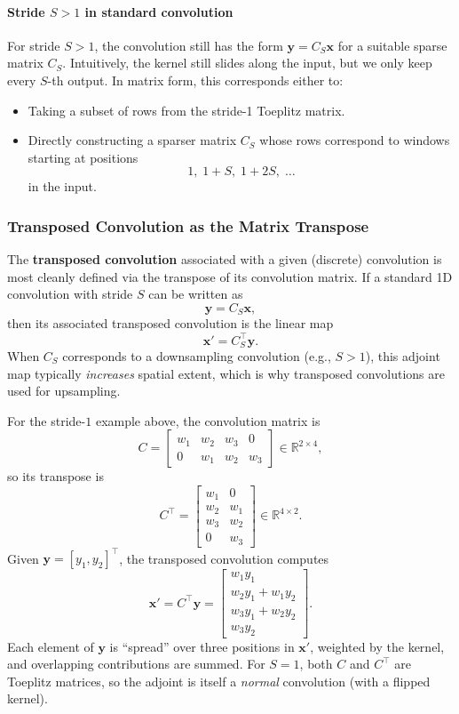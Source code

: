 \paragraph{Stride \(S>1\) in standard convolution}

\noindent
For stride \(S>1\), the convolution still has the form \(\mathbf{y} = C_S \mathbf{x}\) for a suitable sparse matrix \(C_S\). Intuitively, the kernel still slides along the input, but we only keep every \(S\)-th output. In matrix form, this corresponds either to:

\begin{itemize}
	\item Taking a subset of rows from the stride-1 Toeplitz matrix.
	\item Directly constructing a sparser matrix \(C_S\) whose rows correspond to windows starting at positions
	\[
	1,\; 1 + S,\; 1 + 2S,\; \dots
	\]
	in the input.
\end{itemize}

\subsubsection{Transposed Convolution as the Matrix Transpose}

\noindent
The \textbf{transposed convolution} associated with a given (discrete) convolution is most cleanly defined via the transpose of its convolution matrix. If a standard 1D convolution with stride \(S\) can be written as
\[
\mathbf{y} = C_S \mathbf{x},
\]
then its associated transposed convolution is the linear map
\[
\mathbf{x}' = C_S^\top \mathbf{y}.
\]
When \(C_S\) corresponds to a downsampling convolution (e.g., \(S > 1\)), this adjoint map typically \emph{increases} spatial extent, which is why transposed convolutions are used for upsampling.

\medskip

\noindent
For the stride-\(1\) example above, the convolution matrix is
\[
C =
\begin{bmatrix}
	w_1 & w_2 & w_3 & 0 \\
	0   & w_1 & w_2 & w_3
\end{bmatrix}
\in \mathbb{R}^{2 \times 4},
\]
so its transpose is
\[
C^\top =
\begin{bmatrix}
	w_1 & 0   \\
	w_2 & w_1 \\
	w_3 & w_2 \\
	0   & w_3
\end{bmatrix}
\in \mathbb{R}^{4 \times 2}.
\]
Given \(\mathbf{y} = [y_1, y_2]^\top\), the transposed convolution computes
\[
\mathbf{x}' = C^\top \mathbf{y}
=
\begin{bmatrix}
	w_1 y_1 \\
	w_2 y_1 + w_1 y_2 \\
	w_3 y_1 + w_2 y_2 \\
	w_3 y_2
\end{bmatrix}.
\]
Each element of \(\mathbf{y}\) is ``spread'' over three positions in \(\mathbf{x}'\), weighted by the kernel, and overlapping contributions are summed. For \(S=1\), both \(C\) and \(C^\top\) are Toeplitz matrices, so the adjoint is itself a \emph{normal} convolution (with a flipped kernel).

